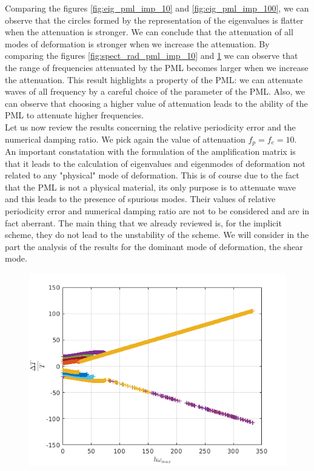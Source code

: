 \begin{itemize}
\begin{figure}[H]
\begin{minipage}{.5\textwidth}
  \label{fig:spect_rad_pml_imp_100}
\end{minipage}
\end{figure} 
Comparing the figures \ref{fig:eig_pml_imp_10} and \ref{fig:eig_pml_imp_100}, we can observe that the circles formed by the representation of the eigenvalues is flatter when the attenuation is stronger. We can conclude that the attenuation of all modes of deformation is stronger when we increase the attenuation. By comparing the figures \ref{fig:spect_rad_pml_imp_10} and \ref{fig:spect_rad_pml_imp_100} we can observe that the range of frequencies attenuated by the PML becomes larger when we increase the attenuation. This result highlights a property of the PML: we can attenuate waves of all frequency by a careful choice of the parameter of the PML. Also, we can observe that choosing a higher value of attenuation leads to the ability of the PML to attenuate higher frequencies. \\
Let us now review the results concerning the relative periodicity error and the numerical damping ratio. We pick again the value of attenuation $f_p = f_e = 10$. An important constatation with the formulation of the amplification matrix is that it leads to the calculation of eigenvalues and eigenmodes of deformation not related to any "physical" mode of deformation. This is of course due to the fact that the PML is not a physical material, its only purpose is to attenuate wave and this leads to the presence of spurious modes. Their values of relative periodicity error and numerical damping ratio are not to be considered and are in fact aberrant. The main thing that we already reviewed is, for the implicit scheme, they do not lead to the unstability of the scheme. We will consider in the part the analysis of the results for the dominant mode of deformation, the shear mode.  
\begin{figure}[H]
\centering
\begin{minipage}{.5\textwidth}
  \centering
  \includegraphics[width=1.\linewidth]{images/rel_per_err_pml_imp_10.png}

\end{minipage}
\end{figure}
\end{itemize}
